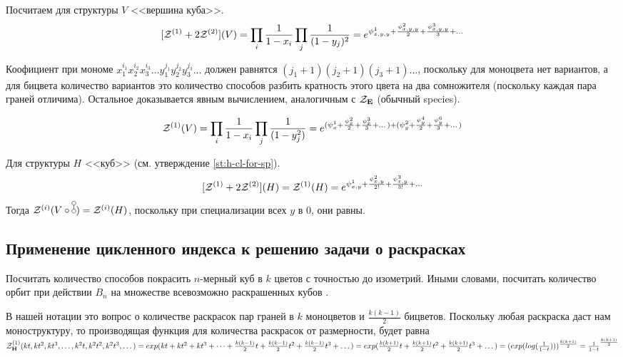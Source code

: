 \begin{example}
Посчитаем для структуры $V$ <<вершина куба>>.
$$
[\mathcal Z^{(1)} + 2\mathcal Z^{(2)}](V) = \prod_i \frac{1}{1 - x_i} \prod_j \frac{1}{(1 -
y_j)^2} = e^{\psi_{x,y,y}^{1} + \frac{\psi_{x,y,y}^{2}}{2} +
\frac{\psi_{x,y,y}^{3}}{3} + \dots} 
$$

Коофициент при мономе $x_1^{i_1}x_2^{i_2}x_3^{i_3} \ldots
y_1^{j_1}y_2^{j_2}y_3^{j_3} \ldots$ должен равнятся $(j_1+1)(j_2+1)(j_3+1)
\ldots$, поскольку для моноцвета нет вариантов, а для бицвета количество
вариантов это количество способов разбить кратность этого цвета на два
сомножителя (поскольку каждая пара граней отличима). Остальное доказывается
явным вычислением, аналогичным с $\mathcal Z_{\mathbf E}$ (обычный species).

$$
\mathcal Z^{(1)}(V) = \prod_i \frac{1}{1 - x_i} \prod_j \frac{1}{(1 -
y_j^2)} = e^{(\psi_{x}^{1} + \frac{\psi_{x}^{2}}{2} + \frac{\psi_{x}^{3}}{3} +
\dots) + (\psi_{y}^{2} + \frac{\psi_{y}^{4}}{2} +
\frac{\psi_{y}^{6}}{3} + \dots)} 
$$


Для структуры $H$ <<куб>> (см. утверждение \ref{st:h-cl-for-sp}).
$$
[\mathcal Z^{(1)} + 2\mathcal Z^{(2)}](H) = \mathcal Z^{(1)}(H) = e^{\psi_{x,y}^{1} +
\frac{\psi_{x,y}^{2}}{2!} + \frac{\psi_{x,y}^{3}}{3!} + \dots} 
$$
Тогда $\Zi(V \circ \dA) = \Zi(H)$, поскольку
при специализации всех $y$ в $0$, они равны.
\end{example}

\subsection{Применение цикленного индекса к решению задачи о раскрасках}
\begin{problem}
Посчитать количество способов покрасить $n$-мерный куб в $k$ цветов с точностью
до изометрий. Иными словами, посчитать количество орбит при действии $B_n$ на
множестве всевозможно раскрашенных кубов \cite{stack}.
\end{problem}
\begin{solution}
В нашей нотации это вопрос о количестве раскрасок пар граней в $k$ моноцветов и
$\frac{k(k-1)}{2}$ бицветов. Поскольку любая раскраска даст нам моноструктуру,
то производящая функция для количества раскрасок от размерности, будет равна
$\mathcal Z^{(1)}_{\mathbf H}(kt, kt^2, kt^3, \dots, k^2t,
k^2t^2, k^2t^3, \dots) = exp(kt + kt^2 + kt^3 + \dots
+ \frac{k(k-1)}{2}t + \frac{k(k-1)}{2}t^2 + \frac{k(k-1)}{2}t^3 + \dots) =
exp(\frac{k(k+1)}{2}t + \frac{k(k+1)}{2}t^2 + \frac{k(k+1)}{2}t^3 + \dots) =
(exp(log(\frac{1}{1-t})))^{\frac{k(k+1)}{2}} = \frac{1}{1-t}^{\frac{k(k+1)}{2}}$
\end{solution}

